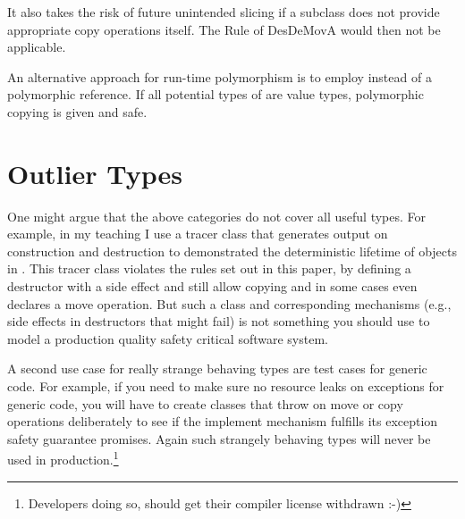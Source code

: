 \documentclass[ebook,11pt,article]{memoir}
\begin{document}
It also takes the risk of future unintended slicing if a subclass does not provide appropriate copy operations itself. The Rule of DesDeMovA would then not be applicable.

An alternative approach for run-time polymorphism is to employ  instead of a polymorphic reference. If all potential types of  are value types, polymorphic copying is given and safe.

\section{Outlier Types}
One might argue that the above categories do not cover all useful \Cpp{} types. For example, in my teaching I use a tracer class that generates output on construction and destruction to demonstrated the deterministic lifetime of objects in \Cpp{}. This tracer class violates the rules set out in this paper, by defining a destructor with a side effect and still allow copying and in some cases even declares a move operation. But such a class and corresponding mechanisms (e.g., side effects in destructors that might fail) is not something you should use to model a production quality safety critical software system.

A second use case for really strange behaving types are test cases for generic code. For example, if you need to make sure no resource leaks on exceptions for generic code, you will have to create classes that throw on move or copy operations deliberately to see if the implement mechanism fulfills its exception safety guarantee promises. Again such strangely behaving types will never be used in production.\footnote{Developers doing so, should get their compiler license withdrawn :-)}
\end{document}
